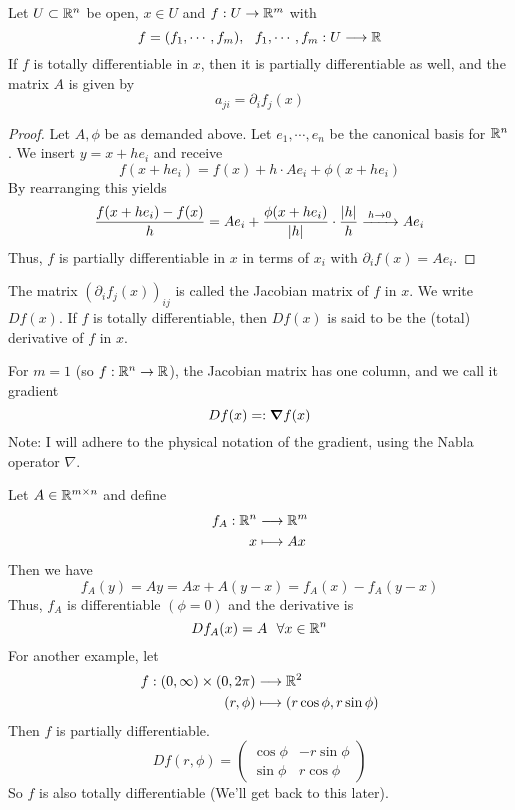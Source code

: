 \documentclass[../../script.tex]{subfiles}
\begin{document}
\begin{thm}
    Let $U \subset \mathbb{R}^n$ be open, $x \in U$ and $f: U \rightarrow \mathbb{R}^m$ with 
    \[
        f = (f_1, \cdots, f_m), ~~f_1, \cdots, f_m: U \longrightarrow \mathbb{R}
    \]
    If $f$ is totally differentiable in $x$, then it is partially differentiable as well, and the matrix $A$ is given by
    \[
        a_{ji} = \partial_i f_j(x)
    \]
\end{thm}
\begin{proof}
    Let $A, \phi$ be as demanded above. Let $e_1, \cdots, e_n$ be the canonical basis for $\mathbb{R}^n$. 
    We insert $y = x + he_i$ and receive 
    \begin{equation}
        f(x + he_i) = f(x) + h \cdot Ae_i + \phi(x + he_i)
    \end{equation}
    By rearranging this yields
    \begin{equation}
        \frac{f(x + he_i) - f(x)}{h} = Ae_i + \frac{\phi(x + he_i)}{|h|} \cdot \frac{|h|}{h} \conv{h \rightarrow 0} Ae_i
    \end{equation}
    Thus, $f$ is partially differentiable in $x$ in terms of $x_i$ with $\partial_i f(x) = Ae_i$.
\end{proof}

\begin{defi}
    The matrix $(\partial_i f_j(x))_{ij}$ is called the Jacobian matrix of $f$ in $x$. 
    We write $Df(x)$. If $f$ is totally differentiable, then $Df(x)$ is said to be the (total) derivative of $f$ in $x$.

    For $m = 1$ (so $f: \mathbb{R}^n \rightarrow \mathbb{R}$), the Jacobian matrix has one column, and we call it gradient
    \[
        Df(x) =: \grad f(x)
    \]
    Note: I will adhere to the physical notation of the gradient, using the Nabla operator $\nabla$.
\end{defi}

\begin{eg}
    Let $A \in \mathbb{R}^{m \times n}$ and define 
    \begin{align*}
        f_A: \mathbb{R}^n &\longrightarrow \mathbb{R}^m \\
        x &\longmapsto Ax
    \end{align*}
    Then we have 
    \[
        f_A(y) = Ay = Ax + A(y - x) = f_A(x) - f_A(y - x)
    \]
    Thus, $f_A$ is differentiable $(\phi = 0)$ and the derivative is 
    \[
        Df_A(x) = A ~~\forall x \in \mathbb{R}^n
    \]
    For another example, let 
    \begin{align*}
        f: (0, \infty) \times (0, 2\pi) &\longrightarrow \mathbb{R}^2 \\
        (r, \phi) &\longmapsto (r \cos \phi, r \sin \phi)
    \end{align*}
    Then $f$ is partially differentiable.
    \[
        Df(r, \phi) = \begin{pmatrix}
            \cos\phi & -r\sin\phi \\
            \sin\phi & r\cos\phi
        \end{pmatrix}
    \]
    So $f$ is also totally differentiable (We'll get back to this later).
\end{eg}
\end{document}
